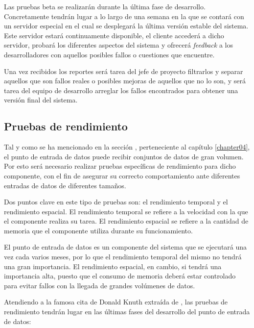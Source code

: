 Las pruebas beta se realizarán durante la última fase de desarrollo.  Concretamente tendrán lugar a lo largo de una semana en la que se contará con un servidor especial en el cual se desplegará la última versión estable del sistema.  Este servidor estará continuamente disponible, el cliente accederá a dicho servidor, probará los diferentes aspectos del sistema y ofrecerá \textit{feedback} a los desarrolladores con aquellos posibles fallos o cuestiones que encuentre.

Una vez recibidos los reportes será tarea del jefe de proyecto filtrarlos y separar aquellos que son fallos reales o posibles mejoras de aquellos que no lo son, y será tarea del equipo de desarrollo arreglar los fallos encontrados para obtener una versión final del sistema.


\subsection{Pruebas de rendimiento}
Tal y como se ha mencionado en la sección , perteneciente al capítulo \ref{chapter04}, el punto de entrada de datos puede recibir conjuntos de datos de gran volumen.  Por esto será necesario realizar pruebas específicas de rendimiento para dicho componente, con el fin de asegurar su correcto comportamiento ante diferentes entradas de datos de diferentes tamaños.

Dos puntos clave en este tipo de pruebas son: el rendimiento temporal y el rendimiento espacial.  El rendimiento temporal se refiere a la velocidad con la que el componente realiza su tarea.  El rendimiento espacial se refiere a la cantidad de memoria que el componente utiliza durante su funcionamiento.

El punto de entrada de datos es un componente del sistema que se ejecutará una vez cada varios meses, por lo que el rendimiento temporal del mismo no tendrá una gran importancia.  El rendimiento espacial, en cambio, si tendrá una importancia alta, puesto que el consumo de memoria deberá estar controlado para evitar fallos con la llegada de grandes volúmenes de datos.

Atendiendo a la famosa cita de Donald Knuth extraída de \cite{knuth:structuredprogramming}, las pruebas de rendimiento tendrán lugar en las últimas fases del desarrollo del punto de entrada de datos:  


